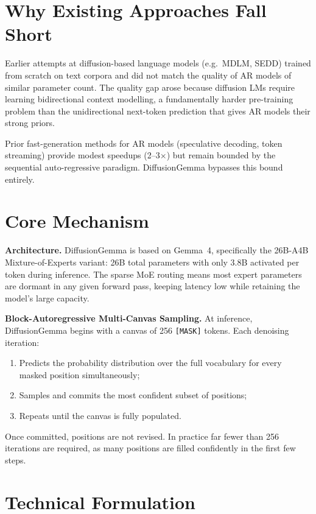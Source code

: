 \documentclass[10pt,twocolumn]{article}
\begin{document}
\section{Why Existing Approaches Fall Short}

Earlier attempts at diffusion-based language models (e.g.\ MDLM, SEDD) trained
from scratch on text corpora and did not match the quality of AR models of similar
parameter count. The quality gap arose because diffusion LMs require learning
bidirectional context modelling, a fundamentally harder pre-training problem than
the unidirectional next-token prediction that gives AR models their strong priors.

Prior fast-generation methods for AR models (speculative decoding, token streaming)
provide modest speedups (2--3$\times$) but remain bounded by the sequential
auto-regressive paradigm. DiffusionGemma bypasses this bound entirely.

\section{Core Mechanism}

\textbf{Architecture.}
DiffusionGemma is based on Gemma~4, specifically the 26B-A4B Mixture-of-Experts
variant: 26B total parameters with only 3.8B activated per token during inference.
The sparse MoE routing means most expert parameters are dormant in any given forward
pass, keeping latency low while retaining the model's large capacity.

\textbf{Block-Autoregressive Multi-Canvas Sampling.}
At inference, DiffusionGemma begins with a canvas of 256 \texttt{[MASK]} tokens.
Each denoising iteration:
\begin{enumerate}[itemsep=2pt,parsep=0pt]
  \item Predicts the probability distribution over the full vocabulary for every
    masked position simultaneously;
  \item Samples and commits the most confident subset of positions;
  \item Repeats until the canvas is fully populated.
\end{enumerate}
Once committed, positions are not revised. In practice far fewer than 256 iterations
are required, as many positions are filled confidently in the first few steps.

\section{Technical Formulation}
\end{document}
